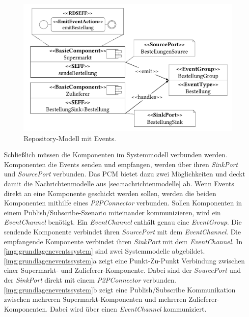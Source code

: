 \begin{figure}
\center
  \includegraphics[width=1\textwidth]{images/grundlagen/grundlagenEventRepo.pdf}
  \caption{Repository-Modell mit Events.}
  \label{img:grundlageneventsrepo}
\end{figure}

Schließlich müssen die Komponenten im Systemmodell verbunden werden. Komponenten die Events senden und empfangen, werden über ihren \emph{SinkPort} und \emph{SourcePort} verbunden. Das PCM bietet dazu zwei Möglichkeiten und deckt damit die Nachrichtenmodelle aus \autoref{sec:nachrichtenmodelle} ab. Wenn Events direkt an eine Komponente geschickt werden sollen, werden die beiden Komponenten mithilfe eines \emph{P2PConnector} verbunden. Sollen Komponenten in einem Publish/Subscribe-Szenario miteinander kommunizieren, wird ein \emph{EventChannel} benötigt. Ein \emph{EventChannel} enthält genau eine \emph{EventGroup}. Die sendende Komponente verbindet ihren \emph{SourcePort} mit dem \emph{EventChannel}. Die empfangende Komponente verbindet ihren \emph{SinkPort} mit dem \emph{EventChannel}. In \autoref{img:grundlageneventssystem} sind zwei Systemmodelle abgebildet. \autoref{img:grundlageneventssystem}a zeigt eine Punkt-Zu-Punkt Verbindung zwischen einer Supermarkt- und Zulieferer-Komponente. Dabei sind der \emph{SourcePort} und der \emph{SinkPort} direkt mit einem \emph{P2PConnector} verbunden. \autoref{img:grundlageneventssystem}b zeigt eine Publish/Subscribe Kommunikation zwischen mehreren Supermarkt-Komponenten und mehreren Zulieferer-Komponenten. Dabei wird über einen \emph{EventChannel} kommuniziert.

